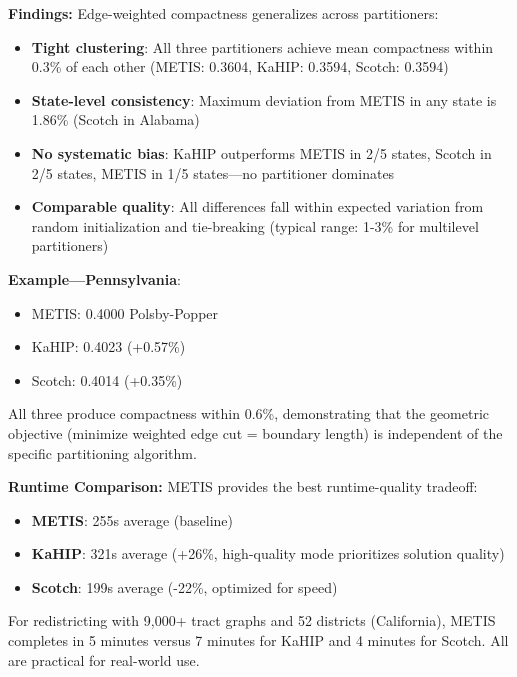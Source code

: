 \textbf{Findings:} Edge-weighted compactness generalizes across partitioners:
\begin{itemize}
    \item \textbf{Tight clustering}: All three partitioners achieve mean compactness within 0.3\% of each other (METIS: 0.3604, KaHIP: 0.3594, Scotch: 0.3594)
    \item \textbf{State-level consistency}: Maximum deviation from METIS in any state is 1.86\% (Scotch in Alabama)
    \item \textbf{No systematic bias}: KaHIP outperforms METIS in 2/5 states, Scotch in 2/5 states, METIS in 1/5 states—no partitioner dominates
    \item \textbf{Comparable quality}: All differences fall within expected variation from random initialization and tie-breaking (typical range: 1-3\% for multilevel partitioners)
\end{itemize}

\textbf{Example—Pennsylvania}:
\begin{itemize}
    \item METIS: 0.4000 Polsby-Popper
    \item KaHIP: 0.4023 (+0.57\%)
    \item Scotch: 0.4014 (+0.35\%)
\end{itemize}

All three produce compactness within 0.6\%, demonstrating that the geometric objective (minimize weighted edge cut = boundary length) is independent of the specific partitioning algorithm.

\textbf{Runtime Comparison:} METIS provides the best runtime-quality tradeoff:
\begin{itemize}
    \item \textbf{METIS}: 255s average (baseline)
    \item \textbf{KaHIP}: 321s average (+26\%, high-quality mode prioritizes solution quality)
    \item \textbf{Scotch}: 199s average (-22\%, optimized for speed)
\end{itemize}

For redistricting with 9,000+ tract graphs and 52 districts (California), METIS completes in 5 minutes versus 7 minutes for KaHIP and 4 minutes for Scotch. All are practical for real-world use.

